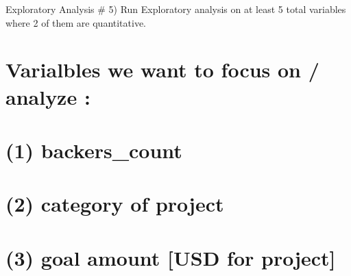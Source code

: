 \documentclass[
]{article}
\newenvironment{Shaded}{\begin{snugshade}}{\end{snugshade}}
\newcommand{\ControlFlowTok}[1]{\textcolor[rgb]{0.13,0.29,0.53}{\textbf{#1}}}
\newcommand{\DecValTok}[1]{\textcolor[rgb]{0.00,0.00,0.81}{#1}}
\newcommand{\KeywordTok}[1]{\textcolor[rgb]{0.13,0.29,0.53}{\textbf{#1}}}
\newcommand{\NormalTok}[1]{#1}
\newcommand{\OperatorTok}[1]{\textcolor[rgb]{0.81,0.36,0.00}{\textbf{#1}}}
\newcommand{\StringTok}[1]{\textcolor[rgb]{0.31,0.60,0.02}{#1}}
\begin{document}
\begin{Shaded}
\end{Shaded}

Exploratory Analysis \# 5) Run Exploratory analysis on at least 5 total
variables where 2 of them are quantitative.

\hypertarget{varialbles-we-want-to-focus-on-analyze}{%
\section{Varialbles we want to focus on / analyze
:}\label{varialbles-we-want-to-focus-on-analyze}}

\hypertarget{backers_count}{%
\section{(1) backers\_count}\label{backers_count}}

\hypertarget{category-of-project}{%
\section{(2) category of project}\label{category-of-project}}

\hypertarget{goal-amount-usd-for-project}{%
\section{(3) goal amount {[}USD for
project{]}}\label{goal-amount-usd-for-project}}
\end{document}
